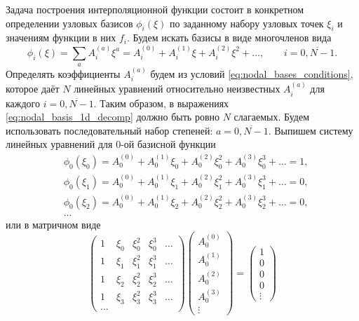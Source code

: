 Задача построения интерполяционной функции состоит
в конкретном определении узловых базисов
$\phi_i(\xi)$ по заданному набору
узловых точек $\xi_i$ и значениям
функции в них $f_i$. Будем искать базисы
в виде многочленов вида
\begin{equation}
\label{eq:nodal_basis_1d_decomp}
\phi_i(\xi) = \sum_{a} A_i^{(a)} \xi^{a} =
A_i^{(0)} + 
A_i^{(1)} \xi + 
A_i^{(2)} \xi^2 +  \ldots, \qquad i = \overline{0, N-1}.
\end{equation}
Определять коэффициенты $A^{(a)}_i$ будем из условий \cref{eq:nodal_bases_conditions},
которое даёт $N$ линейных уравнений относительно неизвестных $A_i^{(a)}$ для каждого $i=\overline{0, N-1}$.
Таким образом, в выражениях \cref{eq:nodal_basis_1d_decomp} должно быть
ровно $N$ слагаемых.
Будем использовать последовательный набор степеней: $a=\overline{0,N-1}$.
Выпишем систему линейных уравнений для $0$-ой базисной функции
\begin{equation*}
\begin{aligned}
& \phi_0(\xi_0) = A_0^{(0)} + A_0^{(1)} \xi_0 + A_0^{(2)} \xi_0^2 + A_0^{(3)} \xi_0^3 + \ldots = 1, \\
& \phi_0(\xi_1) = A_0^{(0)} + A_0^{(1)} \xi_1 + A_0^{(2)} \xi_1^2 + A_0^{(3)} \xi_1^3 + \ldots = 0, \\
& \phi_0(\xi_2) = A_0^{(0)} + A_0^{(1)} \xi_2 + A_0^{(2)} \xi_2^2 + A_0^{(3)} \xi_2^3 + \ldots = 0, \\
& \ldots
\end{aligned}
\end{equation*}
или в матричном виде
\begin{equation*}
\left(
\begin{array}{ccccc}
1 & \xi_0 & \xi_0^2 & \xi_0^3 & \ldots \\[5pt]
1 & \xi_1 & \xi_1^2 & \xi_1^3 & \ldots \\[5pt]
1 & \xi_2 & \xi_2^2 & \xi_2^3 & \ldots \\[5pt]
1 & \xi_3 & \xi_3^2 & \xi_3^3 & \ldots \\[5pt]
\ldots &&&&
\end{array}
\right)
\left(
\begin{array}{c}
A_0^{(0)} \\[5pt]
A_0^{(1)} \\[5pt]
A_0^{(2)} \\[5pt]
A_0^{(3)} \\[5pt]
\vdots
\end{array}
\right)
=
\left(
\begin{array}{c}
1 \\[5pt]
0 \\[5pt]
0 \\[5pt]
0 \\[5pt]
\vdots
\end{array}
\right)
\end{equation*}
